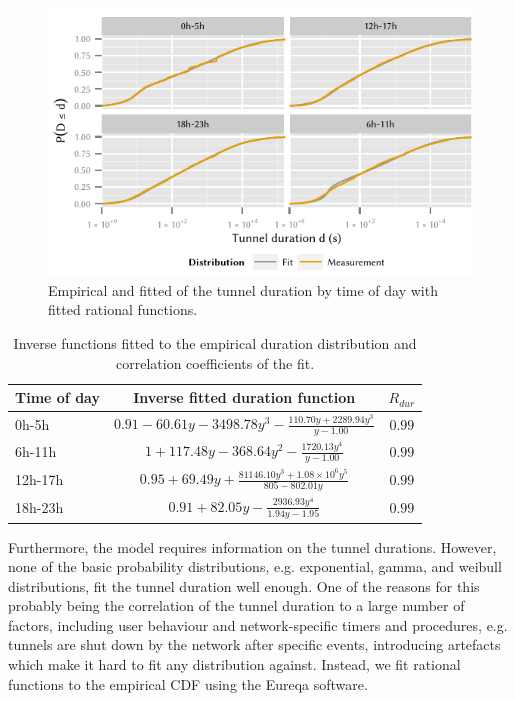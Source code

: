 \begin{figure}
  \centering
  \includegraphics{cloud/virtualized_network_functions/measurement_data/figures/tunnel_duration}
  \caption{Empirical and fitted  of the tunnel duration by time of day with fitted rational functions.}
  \label{fig:cloud:virtualized_network_functions:measurement_data:evaluation:tunnel_duration}
\end{figure}

\begin{table}
  \centering
  \caption{Inverse functions fitted to the empirical duration distribution and correlation coefficients of the fit.}
  \label{tab:cloud:virtualized_network_functions:measurement_data:evaluation:duration_fits}  
  \begin{tabular}{lcc}
  \toprule
  Time of day & Inverse fitted duration function & \(R_{dur}\)\\
  \midrule
  0h-5h & $0.91 - 60.61y - 3498.78y^3 - \frac{110.70y + 2289.94y^3}{y - 1.00}$ &  $0.99$ \\
  6h-11h & $1 + 117.48y - 368.64y^2 - \frac{1720.13y^4}{y - 1.00}$ & $0.99$ \\
  12h-17h & $0.95 + 69.49y + \frac{81146.10y^3 + 1.08\times10^6y^5}{805 - 802.01y}$ & $0.99$ \\
  18h-23h & $0.91 + 82.05y - \frac{2936.93y^4}{1.94y - 1.95}$ & $0.99$\\
  \bottomrule
  \end{tabular}
\end{table}

Furthermore, the model requires information on the tunnel durations.
However, none of the basic probability distributions, e.g. exponential, gamma, and weibull distributions, fit the tunnel duration well enough.
One of the reasons for this probably being the correlation of the tunnel duration to a large number of factors, including user behaviour and network-specific timers and procedures, e.g. tunnels are shut down by the network after specific events, introducing artefacts which make it hard to fit any distribution against.
Instead, we fit rational functions to the empirical \gls{CDF} using the Eureqa \cite{Schmidt2009} software.

